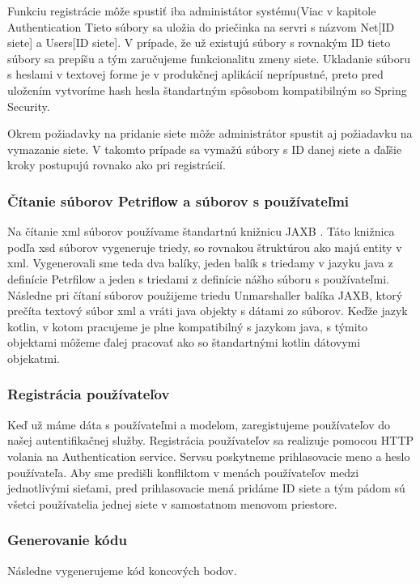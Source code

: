 Funkciu registrácie môže spustiť iba administátor systému(Viac v kapitole Authentication %
Tieto súbory sa uložia do priečinka na servri s názvom Net[ID siete] a Users[ID siete]. V prípade, že už existujú súbory s rovnakým ID tieto súbory sa prepíšu a tým zaručujeme funkcionalitu zmeny siete. 
Ukladanie súboru s heslami v textovej forme je v produkčnej aplikácií neprípustné, preto pred uložením vytvoríme hash hesla štandartným spôsobom kompatibilným so Spring Security.

Okrem požiadavky na pridanie siete môže administrátor spustit aj požiadavku na vymazanie siete. V takomto prípade sa vymažú súbory s ID danej siete a ďaľšie kroky postupujú rovnako ako pri registrácií.


\subsubsection{Čítanie súborov Petriflow a súborov s používateľmi}
Na čítanie \acrshort{xml} súborov používame štandartnú knižnicu JAXB \cite{jaxb}. Táto knižnica podľa \acrshort{xsd} súborov vygeneruje triedy, so rovnakou štruktúrou ako majú entity v \acrshort{xml}.
Vygenerovali sme teda dva balíky, jeden balík s triedamy v jazyku java z definície Petrfilow a jeden s triedami z definície nášho súboru s používateľmi. 
Následne pri čítaní súborov použijeme triedu Unmarshaller balíka JAXB, ktorý prečíta textový súbor \acrshort{xml} a vráti java objekty s dátami zo súborov. Keďže jazyk kotlin, v kotom pracujeme je plne kompatibilný s jazykom java, s týmito objektami môžeme ďalej pracovať ako so štandartnými kotlin dátovymi objekatmi.

\subsubsection{Registrácia používateľov}
Keď už máme dáta s používateľmi a modelom, zaregistujeme používateľov do našej autentifikačnej služby.
Registrácia používateľov sa realizuje pomocou HTTP volania na Authentication service. Servsu poskytneme prihlasovacie meno a heslo používateľa. Aby sme predišli konfliktom v menách používateľov medzi jednotlivými sieťami, pred prihlasovacie mená pridáme ID siete a tým pádom sú všetci používatelia jednej siete v samostatnom menovom priestore.

\subsubsection{Generovanie kódu}
Následne vygenerujeme kód koncových bodov. 


